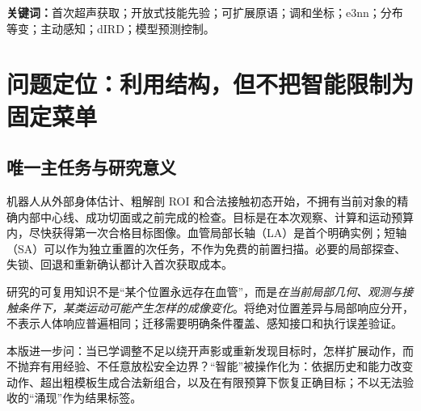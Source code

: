 \documentclass[UTF8,fontset=fandol,11pt,a4paper]{ctexart}
\theoremstyle{plain}
\theoremstyle{definition}
\theoremstyle{remark}
\numberwithin{equation}{section}
\begin{document}
\begin{abstract}
结构化运动表示可以减少重复学习，但封闭的技能菜单、过窄的轨迹族与全过程成像约束，也可能删掉首次超声获取所需的探索和恢复行为。Anatomical GPS V9.4 将原语从硬动作边界改为可扩展的提议先验。系统从公开粗 ROI、调和图册和相关宽解剖先验开始，以本次局部观察维护目标、关联与几何不确定性；共享分型网络在解析几何上学习动作条件响应，并一次提出若干低维短路径参数。通过精确嵌入的嵌套样条族、广支持候选和观察条件分支，方法允许回退、停顿、侧移转动组合、暂时失锁与重新捕获，而不放松物理和接触边界。任务代价、声路代理、dIRD 与实际执行成本在同一参数上优化；保持成像时沿用 V6.1 的最终动作风险，换窗探索时只保留当前确实应成立的过程合同，并在重新确认身份后恢复成像验收。理论区分表示、采样、预测和求解误差；给出嵌套保留、局部裕度下的可行见证保持、分布等变与对称破缺、广支持采样、观察条件决策及最终风险验收的条件性结论。EM 仅用于模糊关联的局部估计，不承担动作智能。首轮协议以无预扫描的首次局部长轴获取为主，检验结构化效率与行为覆盖的权衡、失锁恢复、条件响应迁移、声窗和机器人能力耦合，并与一般短路径搜索及原语参数 Diffusion 作同预算比较。全部性能结论仍待独立闭环验证。
\end{abstract}
\noindent\textbf{关键词：}首次超声获取；开放式技能先验；可扩展原语；调和坐标；e3nn；分布等变；主动感知；dIRD；模型预测控制。
\setcounter{tocdepth}{1}
\begingroup\small\setlength{\parskip}{0pt}\tableofcontents\endgroup
\clearpage

\section{问题定位：利用结构，但不把智能限制为固定菜单}
\label{sec:question}
\subsection{唯一主任务与研究意义}
机器人从外部身体估计、粗解剖 ROI 和合法接触初态开始，不拥有当前对象的精确内部中心线、成功切面或之前完成的检查。目标是在本次观察、计算和运动预算内，尽快获得第一次合格目标图像。血管局部长轴（LA）是首个明确实例；短轴（SA）可以作为独立重置的次任务，不作为免费的前置扫描。必要的局部探查、失锁、回退和重新确认都计入首次获取成本。

研究的可复用知识不是“某个位置永远存在血管”，而是\emph{在当前局部几何、观测与接触条件下，某类运动可能产生怎样的成像变化}。将绝对位置差异与局部响应分开，不表示人体响应普遍相同；迁移需要明确条件覆盖、感知接口和执行误差验证。

本版进一步问：当已学调整不足以绕开声影或重新发现目标时，怎样扩展动作，而不抛弃有用经验、不任意放松安全边界？“智能”被操作化为：依据历史和能力改变动作、超出粗模板生成合法新组合，以及在有限预算下恢复正确目标；不以无法验收的“涌现”作为结果标签。
\end{document}
